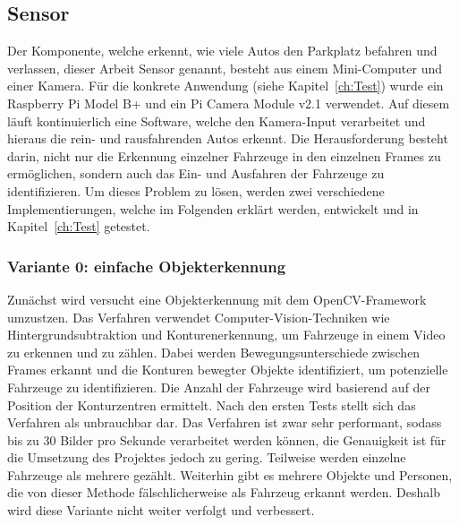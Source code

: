 \subsection{Sensor}\label{ch:Umsetzung_Sensor}

Der Komponente, welche erkennt, wie viele Autos den Parkplatz befahren und verlassen, dieser Arbeit Sensor genannt, besteht aus einem Mini-Computer und einer Kamera.
Für die konkrete Anwendung (siehe Kapitel~\ref{ch:Test}) wurde ein Raspberry Pi Model B+ und ein Pi Camera Module v2.1 verwendet.
Auf diesem läuft kontinuierlich eine Software, welche den Kamera-Input verarbeitet und hieraus die rein- und rausfahrenden Autos erkennt.
Die Herausforderung besteht darin, nicht nur die Erkennung einzelner Fahrzeuge in den einzelnen Frames zu ermöglichen, sondern auch das Ein- und Ausfahren der Fahrzeuge zu identifizieren.
Um dieses Problem zu lösen, werden zwei verschiedene Implementierungen, welche im Folgenden erklärt werden, entwickelt und in Kapitel~\ref{ch:Test} getestet.

\subsubsection{Variante 0: einfache Objekterkennung}
Zunächst wird versucht eine Objekterkennung mit dem OpenCV-Framework umzustzen.
Das Verfahren verwendet Computer-Vision-Techniken wie Hintergrundsubtraktion und Konturenerkennung, um Fahrzeuge in einem Video zu erkennen und zu zählen.
Dabei werden Bewegungsunterschiede zwischen Frames erkannt und die Konturen bewegter Objekte identifiziert, um potenzielle Fahrzeuge zu identifizieren. 
Die Anzahl der Fahrzeuge wird basierend auf der Position der Konturzentren ermittelt.
Nach den ersten Tests stellt sich das Verfahren als unbrauchbar dar.
Das Verfahren ist zwar sehr performant, sodass bis zu 30 Bilder pro Sekunde verarbeitet werden können, die Genauigkeit ist für die Umsetzung des Projektes jedoch zu gering.
Teilweise werden einzelne Fahrzeuge als mehrere gezählt.
Weiterhin gibt es mehrere Objekte und Personen, die von dieser Methode fälschlicherweise als Fahrzeug erkannt werden.
Deshalb wird diese Variante nicht weiter verfolgt und verbessert.


